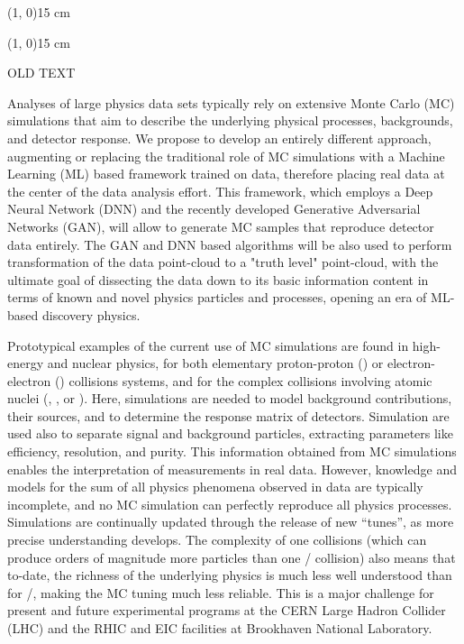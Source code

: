 \line(1, 0){15 cm}

\line(1, 0){15 cm}

OLD TEXT

Analyses of large physics data sets typically rely on extensive Monte Carlo (MC) simulations that aim to describe the underlying physical processes, backgrounds, and detector response. We propose to develop an entirely different  approach, augmenting or replacing the traditional role of MC simulations with a Machine Learning (ML) based framework trained on data, therefore placing real data at the center of the data analysis effort. This framework, which employs a Deep Neural Network (DNN) and the recently developed Generative Adversarial Networks (GAN), will allow to generate MC samples that reproduce detector data entirely. The GAN and DNN based algorithms will be also used to perform transformation of the data point-cloud to a "truth level" point-cloud, with the ultimate goal of dissecting the data down to its basic information content in terms of known and novel physics particles and processes, opening an era of ML-based discovery physics.

Prototypical examples of the current use of MC simulations are found in high-energy and nuclear physics, for both elementary proton-proton (\pp) or electron-electron (\eecol) collisions systems, and for the complex collisions involving atomic nuclei (\eA, \pA, or \aacol). Here, simulations are needed to model background contributions, their sources, and to determine the response matrix of detectors. Simulation are used also to separate signal and background particles, extracting parameters like efficiency, resolution, and purity. This information obtained from MC simulations enables the interpretation of  measurements in real data. However, knowledge and models for the sum of all physics phenomena observed in data are typically incomplete, and no MC simulation can perfectly reproduce all physics processes. Simulations are continually updated through the release of new ``tunes'', as more precise understanding develops. The complexity of one {\aacol} collisions (which can produce orders of magnitude more particles than one \eecol/{\pp} collision) also means that to-date, the richness of the underlying physics is much less well understood than for \eecol/{\pp}, making the MC tuning much less reliable. This is a major challenge for present and future experimental programs at the CERN Large Hadron Collider (LHC) and the RHIC and EIC facilities at Brookhaven National Laboratory.

